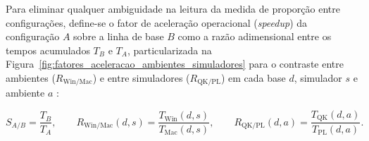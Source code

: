 \documentclass[
    12pt,
    openright,
    oneside,
    a4paper,
    english,
    brazil
]{abntex2}
\begin{document}
Para eliminar qualquer ambiguidade na leitura da medida de proporção entre configurações, define-se o fator de aceleração operacional (\textit{speedup}) da configuração \(A\) sobre a linha de base \(B\) como a razão adimensional entre os tempos acumulados \(T_B\) e \(T_A\), particularizada na Figura~\ref{fig:fatores_aceleracao_ambientes_simuladores} para o contraste entre ambientes (\(R_{\text{Win/Mac}}\)) e entre simuladores (\(R_{\text{QK/PL}}\)) em cada base \(d\), simulador \(s\) e ambiente \(a\) \cite{faj2023warpspeed}:

\begin{equation}
\label{eq:speedup_operacional}
S_{A/B} = \frac{T_B}{T_A},
\qquad
R_{\text{Win/Mac}}(d, s) = \frac{T_{\text{Win}}(d, s)}{T_{\text{Mac}}(d, s)},
\qquad
R_{\text{QK/PL}}(d, a) = \frac{T_{\text{QK}}(d, a)}{T_{\text{PL}}(d, a)}.
\end{equation}
\end{document}
